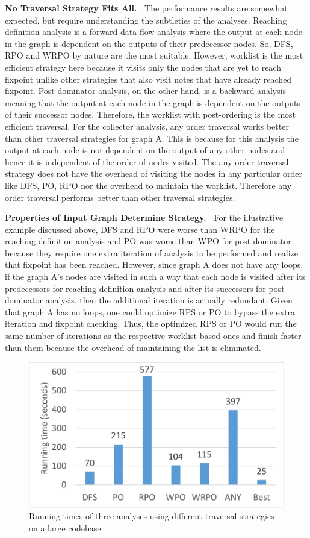 {\bf No Traversal Strategy Fits All.\ } The performance results are
somewhat expected, but require understanding the subtleties of the
analyses. Reaching definition analysis is a forward data-flow analysis
where the output at each node in the graph is dependent on the outputs
of their predecessor nodes.
So, DFS, RPO and WRPO by nature are the most suitable.
However, worklist is the most efficient strategy here because it
visits only the nodes that are yet to reach fixpoint unlike other
strategies that also visit notes that have already reached fixpoint.
Post-dominator analysis, on the other hand, is a backward analysis
meaning that the output at each node in the graph is dependent on the
outputs of their successor nodes. Therefore, the worklist with
post-ordering is the most efficient traversal.
For the collector analysis, any order traversal works better than
other traversal strategies for graph A. This is because for this
analysis the output at each node is not dependent on the output of any
other nodes and hence it is independent of the order of nodes visited.
The any order traversal strategy does not have the overhead of
visiting the nodes in any particular order like DFS, PO, RPO nor the
overhead to maintain the worklist. Therefore any order traversal
performs better than other traversal strategies.

{\bf Properties of Input Graph Determine Strategy.\ }
For the illustrative example discussed above, DFS and RPO were worse
than WRPO for the reaching definition analysis and PO was worse than
WPO for post-dominator because they require one extra iteration of
analysis to be performed and realize that fixpoint has been reached.
However, since graph A does not have any loops, if the graph A's nodes
are visited in such a way that each node is visited after its
predecessors for reaching definition analysis and after its successors
for post-dominator analysis, then the additional iteration is actually
redundant. Given that graph A has no loops, one could optimize RPS or
PO to bypass the extra iteration and fixpoint checking. Thus, the
optimized RPS or PO would run the same number of iterations as the
respective worklist-based ones and finish faster than them because the
overhead of maintaining the list is eliminated.

\begin{figure}
\centering
\includegraphics[width=.6\textwidth]{figures/motivation-sum.pdf}
\caption{Running times of three analyses using different traversal strategies on a large codebase.}
\label{fig:motive}
\end{figure}

